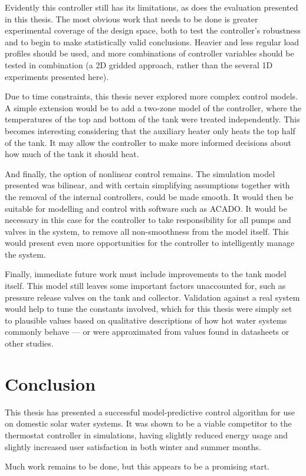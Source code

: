 Evidently this controller still has its limitations, as does the evaluation presented in this thesis.
The most obvious work that needs to be done is greater experimental coverage of the design space, both to test the controller's robustness and to begin to make statistically valid conclusions.
Heavier and less regular load profiles should be used, and more combinations of controller variables should be tested in combination (a 2D gridded approach, rather than the several 1D experiments presented here).

Due to time constraints, this thesis never explored more complex control models.
A simple extension would be to add a two-zone model of the controller, where the temperatures of the top and bottom of the tank were treated independently.
This becomes interesting considering that the auxiliary heater only heats the top half of the tank.
It may allow the controller to make more informed decisions about how much of the tank it should heat.

And finally, the option of nonlinear control remains.
The simulation model presented was bilinear, and with certain simplifying assumptions together with the removal of the internal controllers, could be made smooth.
It would then be suitable for modelling and control with software such as ACADO.
It would be necessary in this case for the controller to take responsibility for all pumps and valves in the system, to remove all non-smoothness from the model itself.
This would present even more opportunities for the controller to intelligently manage the system.

Finally, immediate future work must include improvements to the tank model itself.
This model still leaves some important factors unaccounted for, such as pressure release valves on the tank and collector.
Validation against a real system would help to tune the constants involved, which for this thesis were simply set to plausible values based on qualitative descriptions of how hot water systems commonly behave --- or were approximated from values found in datasheets or other studies.

\section{Conclusion}

This thesis has presented a successful model-predictive control algorithm for use on domestic solar water systems.
It was shown to be a viable competitor to the thermostat controller in simulations, having slightly reduced energy usage and slightly increased user satisfaction in both winter and summer months.

Much work remains to be done, but this appears to be a promising start.
